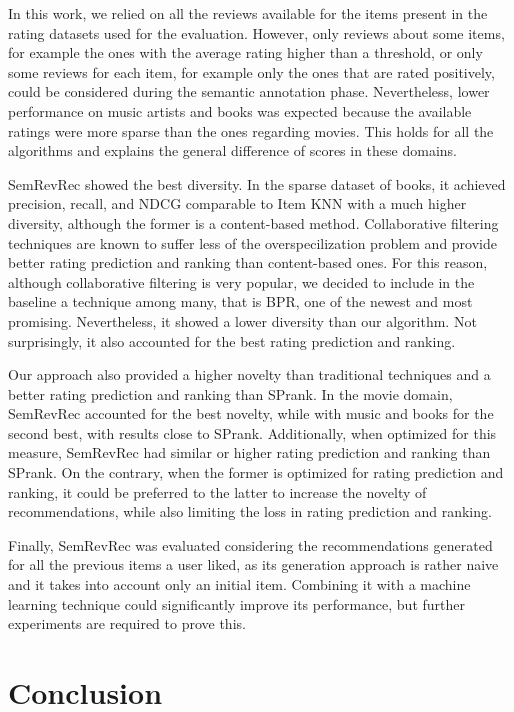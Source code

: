 In this work, we relied on all the reviews available for the items present in the rating datasets used for the evaluation. However, only reviews about some items, for example the ones with the average rating higher than a threshold, or only some reviews for each item, for example only the ones that are rated positively, could be considered during the semantic annotation phase. Nevertheless, lower performance on music artists and books was expected because the available ratings were more sparse than the ones regarding movies. This holds for all the algorithms and explains the general difference of scores in these domains. 

SemRevRec showed the best diversity. In the sparse dataset of books, it achieved precision, recall, and NDCG comparable to Item KNN with a much higher diversity, although the former is a content-based method. Collaborative filtering techniques are known to suffer less of the overspecilization problem and provide better rating prediction and ranking than content-based ones. For this reason, although collaborative filtering is very popular, we decided to include in the baseline a technique among many, that is BPR, one of the newest and most promising. Nevertheless, it showed a lower diversity than our algorithm. Not surprisingly, it also accounted for the best rating prediction and ranking. 

Our approach also provided a higher novelty than traditional techniques and a better rating prediction and ranking than SPrank. In the movie domain, SemRevRec accounted for the best novelty, while with music and books for the second best, with results close to SPrank. Additionally, when optimized for this measure, SemRevRec had similar or higher rating prediction and ranking than SPrank. On the contrary, when the former is optimized for rating prediction and ranking, it could be preferred to the latter to increase the novelty of recommendations, while also limiting the loss in rating prediction and ranking.

Finally, SemRevRec was evaluated considering the recommendations generated for all the previous items a user liked, as its generation approach is rather naive and it takes into account only an initial item. Combining it with a machine learning technique could significantly improve its performance, but further experiments are required to prove this.

\section{Conclusion}
\label{srr:sec:concl}


